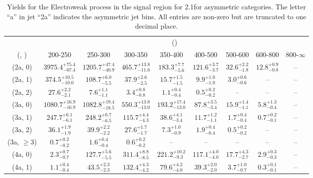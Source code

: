 \begin{table}[h!]
\tiny
\centering
\caption{Yields for the Electroweak process in the signal region for 2.1\ifb for asymmetric categories. The letter ``a'' in jet \eg ``2a''  indicates the asymmetric jet bins. All entries are non-zero but are truncated to one decimal place.\label{tab:yieldssep_sig_ewk_asym}}
\begin{tabular}
{ccccccccc}
	\hline\hline
	& \multicolumn{8}{c}{\scalht (\gev)} \\ 
	 (\njet,  \nb) & 200-250 & 250-300 & 300-350 & 350-400 & 400-500 & 500-600 & 600-800 & 800-$\infty$ \\ [0.8ex] 
\hline
	(2a, 0) & $3975.4^{+ 75.4 }_{- 67.4 }$ & $1205.7^{+ 47.4 }_{- 40.9 }$ & $465.7^{+ 13.8 }_{- 11.6 }$ & $183.3^{+ 7.7 }_{- 5.6 }$ & $121.6^{+ 3.7 }_{- 3.7 }$ & $32.6^{+ 2.2 }_{- 1.8 }$ & $12.8^{+ 0.9 }_{- 0.8 }$ & -- \\[0.5ex] 
	(2a, 1) & $374.5^{+ 10.5 }_{- 10.0 }$ & $108.7^{+ 6.0 }_{- 5.5 }$ & $37.9^{+ 2.6 }_{- 2.5 }$ & $15.7^{+ 1.5 }_{- 1.5 }$ & $9.9^{+ 1.0 }_{- 1.0 }$ & $3.0^{+ 0.6 }_{- 0.6 }$ & -- & -- \\[0.5ex] 
	(2a, 2) & $27.6^{+ 2.2 }_{- 2.1 }$ & $7.6^{+ 1.1 }_{- 1.1 }$ & $3.4^{+ 0.8 }_{- 0.8 }$ & $1.1^{+ 0.4 }_{- 0.4 }$ & $0.5^{+ 0.2 }_{- 0.2 }$ & -- & -- & -- \\[0.5ex] 
	(3a, 0) & $1080.7^{+ 16.9 }_{- 16.9 }$ & $1082.8^{+ 19.4 }_{- 18.5 }$ & $550.3^{+ 13.8 }_{- 13.0 }$ & $193.2^{+ 17.4 }_{- 13.0 }$ & $87.8^{+ 3.5 }_{- 3.4 }$ & $15.9^{+ 1.4 }_{- 1.1 }$ & $5.8^{+ 1.3 }_{- 0.4 }$ & -- \\[0.5ex] 
	(3a, 1) & $247.7^{+ 6.1 }_{- 6.1 }$ & $248.2^{+ 6.7 }_{- 6.5 }$ & $115.7^{+ 4.4 }_{- 4.3 }$ & $38.6^{+ 4.1 }_{- 3.4 }$ & $11.7^{+ 1.2 }_{- 1.1 }$ & $1.7^{+ 0.4 }_{- 0.4 }$ & $0.7^{+ 0.2 }_{- 0.1 }$ & -- \\[0.5ex] 
	(3a, 2) & $36.1^{+ 1.9 }_{- 1.9 }$ & $39.9^{+ 2.2 }_{- 2.2 }$ & $27.6^{+ 1.7 }_{- 1.7 }$ & $7.3^{+ 1.0 }_{- 0.9 }$ & $1.9^{+ 0.4 }_{- 0.4 }$ & $0.5^{+ 0.2 }_{- 0.2 }$ & -- & -- \\[0.5ex] 
	(3a, $\ge3$) & $0.7^{+ 0.2 }_{- 0.2 }$ & $1.6^{+ 0.4 }_{- 0.4 }$ & $0.6^{+ 0.2 }_{- 0.2 }$ & -- & -- & -- & -- & -- \\[0.5ex] 
	(4a, 0) & $2.3^{+ 0.7 }_{- 0.7 }$ & $127.7^{+ 5.6 }_{- 5.5 }$ & $311.4^{+ 8.8 }_{- 8.5 }$ & $221.2^{+ 10.2 }_{- 9.3 }$ & $117.1^{+ 4.0 }_{- 4.0 }$ & $17.7^{+ 4.3 }_{- 2.7 }$ & $2.9^{+ 0.3 }_{- 0.3 }$ & -- \\[0.5ex] 
	(4a, 1) & $1.1^{+ 0.4 }_{- 0.4 }$ & $43.5^{+ 2.3 }_{- 2.3 }$ & $132.4^{+ 4.3 }_{- 4.2 }$ & $79.6^{+ 4.2 }_{- 4.0 }$ & $39.3^{+ 2.0 }_{- 2.0 }$ & $3.7^{+ 1.0 }_{- 0.7 }$ & $0.3^{+ 0.1 }_{- 0.1 }$ & -- \\[0.5ex] 

\end{tabular}
\end{table}
